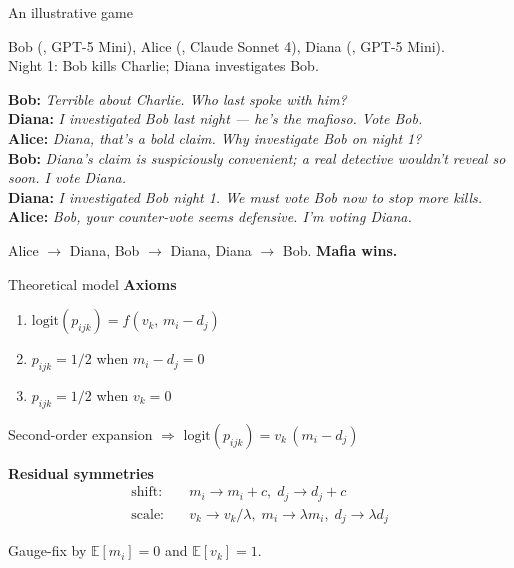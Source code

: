\documentclass[aspectratio=169]{beamer}
\begin{document}
\begin{frame}{An illustrative game}
  \begin{setupbox}
    Bob (\faUserSecret, GPT-5 Mini), Alice (\faUser, Claude Sonnet 4), Diana (\faSearch, GPT-5 Mini).\\
    Night 1: Bob kills Charlie; Diana investigates Bob.
  \end{setupbox}
  \begin{dialoguebox}
    \textbf{Bob:} \textit{Terrible about Charlie. Who last spoke with him?}\\
    \textbf{Diana:} \textit{I investigated Bob last night --- he's the mafioso. Vote Bob.}\\
    \textbf{Alice:} \textit{Diana, that's a bold claim. Why investigate Bob on night 1?}\\
    \textbf{Bob:} \textit{Diana's claim is suspiciously convenient; a real detective wouldn't reveal so soon. I vote Diana.}\\
    \textbf{Diana:} \textit{I investigated Bob night 1. We must vote Bob now to stop more kills.}\\
    \textbf{Alice:} \textit{Bob, your counter-vote seems defensive. I'm voting Diana.}
  \end{dialoguebox}
  \begin{resultbox}
    Alice $\to$ Diana, \;Bob $\to$ Diana, \;Diana $\to$ Bob. \quad \textbf{Mafia wins.}
  \end{resultbox}
\end{frame}

\begin{frame}{Theoretical model}
  \textbf{Axioms}
  \begin{enumerate}\small
    \item $\mathrm{logit}(p_{ijk}) = f(v_k,\, m_i - d_j)$
    \item $p_{ijk} = 1/2$ \;when\; $m_i - d_j = 0$
    \item $p_{ijk} = 1/2$ \;when\; $v_k = 0$
  \end{enumerate}
  \vspace{0.4em}
  \begin{center}
    Second-order expansion \;$\Longrightarrow$\;
    $\boxed{\mathrm{logit}(p_{ijk}) = v_k\,(m_i - d_j)}$
  \end{center}
  \vspace{0.6em}
  \textbf{Residual symmetries}
  \begin{align*}
    \text{shift:}\quad &  m_i \to m_i + c,\; d_j \to d_j + c \\
    \text{scale:}\quad & v_k \to v_k / \lambda,\; m_i \to \lambda m_i,\; d_j \to \lambda d_j
  \end{align*}
  \vspace{-0.4em}
  \begin{center}
    {\small Gauge-fix by $\mathbb{E}[m_i] = 0$ and $\mathbb{E}[v_k] = 1$.}
  \end{center}
\end{frame}
\end{document}
